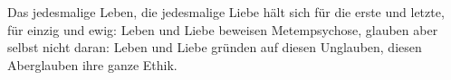 Das jedesmalige Leben, die jedesmalige Liebe hält sich für die erste und letzte, für einzig und ewig: Leben und Liebe beweisen Metempsychose, glauben aber selbst nicht daran: Leben und Liebe gründen auf diesen Unglauben, diesen Aberglauben ihre ganze Ethik.
\par

